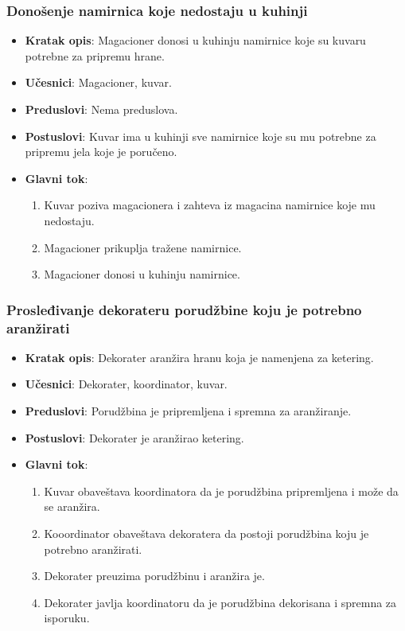 \subsubsection{Donošenje namirnica koje nedostaju u kuhinji}
\begin{itemize}
    \item \textbf{Kratak opis}:
    Magacioner donosi u kuhinju namirnice koje su kuvaru potrebne za pripremu hrane.
    \item \textbf{Učesnici}:
    Magacioner, kuvar.
    \item \textbf{Preduslovi}:
    Nema preduslova.
    \item \textbf{Postuslovi}:
    Kuvar ima u kuhinji sve namirnice koje su mu potrebne za pripremu jela koje je poručeno.
    \item \textbf{Glavni tok}:
   \begin{enumerate}
        \item Kuvar poziva magacionera i zahteva iz magacina namirnice koje mu nedostaju.
        \item Magacioner prikuplja tražene namirnice.
        \item Magacioner donosi u kuhinju namirnice.
\end{enumerate}
\end{itemize}

\subsubsection{Prosleđivanje dekorateru porudžbine koju je potrebno aranžirati}
\begin{itemize}
    \item \textbf{Kratak opis}:
    Dekorater aranžira hranu koja je
    namenjena za ketering.
    \item \textbf{Učesnici}: 
    Dekorater, koordinator, kuvar.
    \item \textbf{Preduslovi}:
    Porudžbina je pripremljena i spremna
    za aranžiranje.
    \item \textbf{Postuslovi}:
    Dekorater je aranžirao ketering.
    \item \textbf{Glavni tok}:
   \begin{enumerate}
        \item Kuvar obaveštava koordinatora da
        je porudžbina pripremljena i može da 
        se aranžira.
        \item Kooordinator obaveštava
        dekoratera da postoji porudžbina koju je potrebno aranžirati.
        \item Dekorater preuzima porudžbinu i aranžira je.
        \item Dekorater javlja koordinatoru da 
        je porudžbina dekorisana i spremna za isporuku.
\end{enumerate}
\end{itemize}


